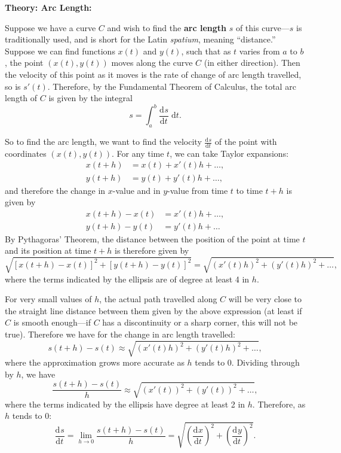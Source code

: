 \documentclass{article}
\newcommand{\deriv}[3][]{\frac{\mathrm{d}^{#1}#2}{\mathrm{d}#3^{#1}}}
\newcommand{\diff}{\;\mathrm{d}}
\begin{document}
\clearpage


\textbf{Theory: Arc Length:}

\bigskip



Suppose we have a curve $C$ and wish to find the \textbf{arc length} $s$ of this curve---$s$ is traditionally used, and is short for the Latin \textit{spatium}, meaning ``distance.'' Suppose we can find functions $x(t)$ and $y(t)$, such that as $t$ varies from $a$ to $b$, the point $(x(t),y(t))$ moves along the curve $C$ (in either direction). Then the velocity of this point as it moves is the rate of change of arc length travelled, so is $s'(t)$. Therefore, by the Fundamental Theorem of Calculus, the total arc length of $C$ is given by the integral
\[s=\int_a^b\deriv{s}{t}\diff t.\]

So to find the arc length, we want to find the velocity $\deriv{s}{t}$ of the point with coordinates $(x(t),y(t))$. For any time $t$, we can take Taylor expansions:
\begin{align*}
	x(t+h)&=x(t)+x'(t)h+\hdots,\\
	y(t+h)&=y(t)+y'(t)h+\hdots,
\end{align*}
and therefore the change in $x$-value and in $y$-value from time $t$ to time $t+h$ is given by
\begin{align*}
	x(t+h)-x(t)&=x'(t)h+\hdots,\\
	y(t+h)-y(t)&=y'(t)h+\hdots
\end{align*}
By Pythagoras' Theorem, the distance between the position of the point at time $t$ and its position at time $t+h$ is therefore given by
\[\sqrt{\left[x(t+h)-x(t)\right]^2+\left[y(t+h)-y(t)\right]^2} = \sqrt{(x'(t)h)^2+(y'(t)h)^2+\hdots},\]
where the terms indicated by the ellipsis are of degree at least 4 in $h$.

For very small values of $h$, the actual path travelled along $C$ will be very close to the straight line distance between them given by the above expression (at least if $C$ is smooth enough---if $C$ has a discontinuity or a sharp corner, this will not be true). Therefore we have for the change in arc length travelled:
\[s(t+h)-s(t)\approx\sqrt{(x'(t)h)^2+(y'(t)h)^2+\hdots},\]
where the approximation grows more accurate as $h$ tends to 0. Dividing through by $h$, we have
\[\frac{s(t+h)-s(t)}{h}\approx \sqrt{(x'(t))^2+(y'(t))^2+\hdots},\]
where the terms indicated by the ellipsis have degree at least 2 in $h$. Therefore, as $h$ tends to 0:
\[\deriv{s}{t}=\lim_{h\to 0}\frac{s(t+h)-s(t)}{h}=\sqrt{\left(\deriv{x}{t}\right)^2+\left(\deriv{y}{t}\right)^2}.\]
\end{document}
